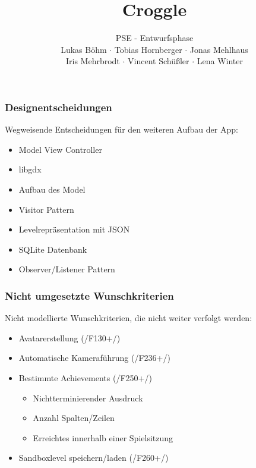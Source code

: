 \documentclass[t]{beamer}
\title{Croggle}
\subtitle{PSE - Entwurfsphase \\[0.3cm]
Lukas Böhm $\cdot$ Tobias Hornberger $\cdot$ Jonas Mehlhaus \\ Iris Mehrbrodt  $\cdot$ Vincent Schüßler $\cdot$ Lena Winter}
\institute[IPD]{Institut für Programmstruktutren und Datenorganisation}
\begin{document}
\begin{frame}
        \maketitle
\end{frame}

\begin{frame}
	\frametitle{Designentscheidungen}
	Wegweisende Entscheidungen für den weiteren Aufbau der App:\\
	\begin{itemize}
		\item Model View Controller
		\item libgdx
		\item Aufbau des Model
		\item Visitor Pattern
		\item Levelrepräsentation mit JSON
		\item SQLite Datenbank
		\item Observer/Listener Pattern
	\end{itemize}

\end{frame}

\begin{frame}
	\frametitle{Nicht umgesetzte Wunschkriterien}
	Nicht modellierte Wunschkriterien, die nicht weiter verfolgt werden: \\
	\begin{itemize}
		\item Avatarerstellung (/F130+/)
		\item Automatische Kameraführung (/F236+/)
		\item Bestimmte Achievements (/F250+/)
		\begin{itemize}
			\item Nichtterminierender Ausdruck
			\item Anzahl Spalten/Zeilen
			\item Erreichtes innerhalb einer Spielsitzung
		\end{itemize}

		\item Sandboxlevel speichern/laden (/F260+/)
	\end{itemize}
\end{frame}
\end{document}
